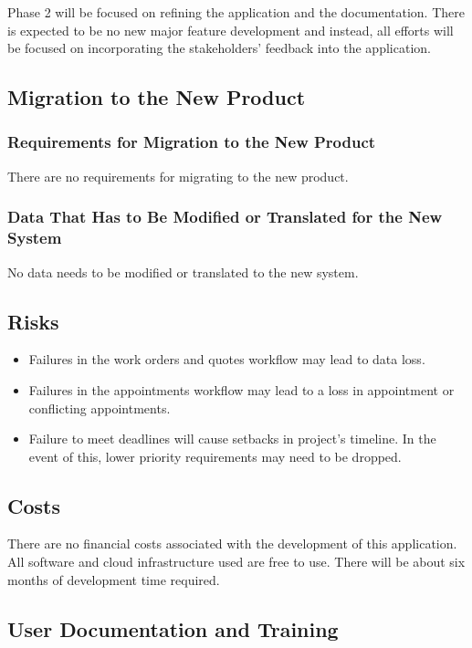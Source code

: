 \documentclass[12pt]{article}
\begin{document}
Phase 2 will be focused on refining the application and the documentation. There is expected to be
no new major feature development and instead, all efforts will be focused on incorporating the
stakeholders' feedback into the application.

\subsection{Migration to the New Product}
\subsubsection{Requirements for Migration to the New Product}

There are no requirements for migrating to the new product.

\subsubsection{Data That Has to Be Modified or Translated for the New System}

No data needs to be modified or translated to the new system.

\subsection{Risks}

\begin{itemize}
	\item Failures in the work orders and quotes workflow may lead to data loss.
	\item Failures in the appointments workflow may lead to a loss in appointment or conflicting
	      appointments.
	\item Failure to meet deadlines will cause setbacks in project's timeline. In the event of this, lower
	      priority requirements may need to be dropped.
\end{itemize}

\subsection{Costs}

There are no financial costs associated with the development of this application. All software and
cloud infrastructure used are free to use. There will be about six months of development time
required.

\subsection{User Documentation and Training}
\end{document}
